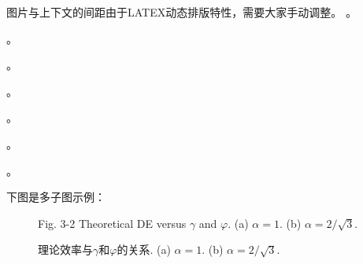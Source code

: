 图片与上下文的间距由于LATEX动态排版特性，需要大家手动调整。
。

。

。

。

。

。

。

下图是多子图示例：
\vspace{-1cm}

\begin{figure}[h]
	\centering
	\caption{\wuhao 理论效率与$\gamma$和$\varphi$的关系. (a) $\alpha=1$. (b) $\alpha=2/\sqrt{3}$.}
	\wuhao Fig. 3-2 Theoretical DE versus $\gamma$ and $\varphi$. (a) $\alpha=1$. (b) $\alpha=2/\sqrt{3}$.
\end{figure}

